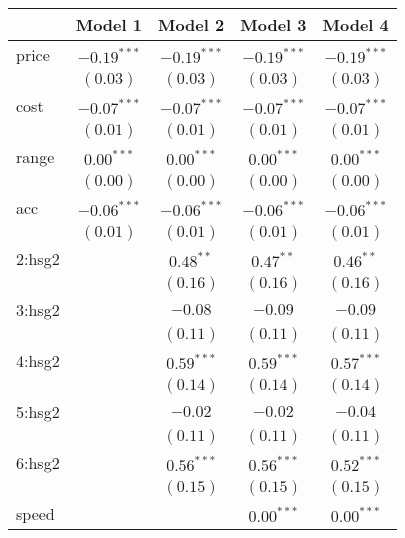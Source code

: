 
\begin{table}
\tiny
\begin{center}
\begin{tabular}{l c c c c }
\hline
 & Model 1 & Model 2 & Model 3 & Model 4 \\
\hline
price          & $-0.19^{***}$ & $-0.19^{***}$ & $-0.19^{***}$ & $-0.19^{***}$ \\
               & $(0.03)$      & $(0.03)$      & $(0.03)$      & $(0.03)$      \\
cost           & $-0.07^{***}$ & $-0.07^{***}$ & $-0.07^{***}$ & $-0.07^{***}$ \\
               & $(0.01)$      & $(0.01)$      & $(0.01)$      & $(0.01)$      \\
range          & $0.00^{***}$  & $0.00^{***}$  & $0.00^{***}$  & $0.00^{***}$  \\
               & $(0.00)$      & $(0.00)$      & $(0.00)$      & $(0.00)$      \\
acc            & $-0.06^{***}$ & $-0.06^{***}$ & $-0.06^{***}$ & $-0.06^{***}$ \\
               & $(0.01)$      & $(0.01)$      & $(0.01)$      & $(0.01)$      \\
2:hsg2         &               & $0.48^{**}$   & $0.47^{**}$   & $0.46^{**}$   \\
               &               & $(0.16)$      & $(0.16)$      & $(0.16)$      \\
3:hsg2         &               & $-0.08$       & $-0.09$       & $-0.09$       \\
               &               & $(0.11)$      & $(0.11)$      & $(0.11)$      \\
4:hsg2         &               & $0.59^{***}$  & $0.59^{***}$  & $0.57^{***}$  \\
               &               & $(0.14)$      & $(0.14)$      & $(0.14)$      \\
5:hsg2         &               & $-0.02$       & $-0.02$       & $-0.04$       \\
               &               & $(0.11)$      & $(0.11)$      & $(0.11)$      \\
6:hsg2         &               & $0.56^{***}$  & $0.56^{***}$  & $0.52^{***}$  \\
               &               & $(0.15)$      & $(0.15)$      & $(0.15)$      \\
speed          &               &               & $0.00^{***}$  & $0.00^{***}$  \\

\end{tabular}
\end{center}
\end{table}
